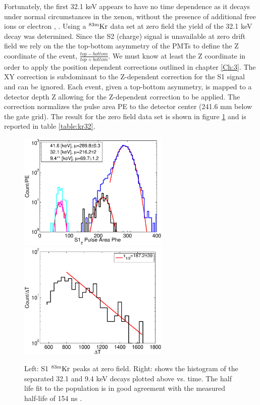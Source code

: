 Fortunately, the first 32.1 keV appears to have no time dependence as it decays under normal circumstances in the xenon, without the presence of additional free ions or electron \cite{Baudis}, \cite{Aprile_LY}. Using a $\rm^{83m}Kr$ data set at zero field the yield of the 32.1 keV decay was determined. Since the S2 (charge) signal is unavailable at zero drift field we rely on the the top-bottom asymmetry of the PMTs to define the Z coordinate of the event, $\frac{top-bottom}{top+bottom} $. We must know at least the Z coordinate in order to apply the position dependent corrections outlined in chapter \ref{Ch:3}. The XY correction is subdominant to the Z-dependent correction for the S1 signal and can be ignored. Each event, given a top-bottom asymmetry, is mapped to a detector depth Z allowing for the Z-dependent correction to be applied. The correction normalizes the pulse area PE to the detector center (241.6 mm below the gate grid). The result for the zero field data set is shown in figure \ref{fig:ZeroField_Kr} and is reported in table \ref{table:kr32}.
 
 \begin{figure}[h!]\centering
\includegraphics[width=72mm]{Chapter_Flucs/Figures/S1_Z_no_field_lux10_20131009T1358_cp09670} %
\includegraphics[width=72mm]{Chapter_Flucs/Figures/dT_no_field_2lux10_20131009T1358_cp09670}
\caption{Left: S1 $\rm^{83m}Kr$ peaks at zero field. Right: shows the histogram of the separated 32.1 and 9.4 keV decays plotted above vs. time. The half life fit to the population is in good agreement with the measured half-life of 154 ns \cite{83Kr_HalfLife_1} \cite{83Kr_HalfLife_2}. }
\label{fig:ZeroField_Kr}
\end{figure}


